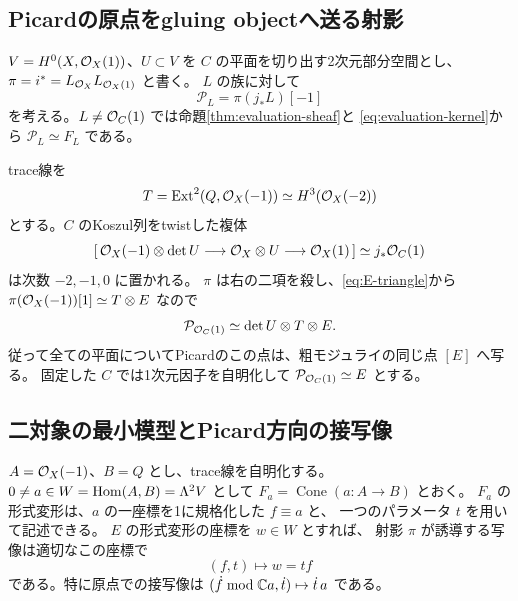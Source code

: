 \subsection{Picardの原点をgluing objectへ送る射影}

$V=H^0(X,\mathcal O_X(1))$、$U\subset V$ を $C$ の平面を切り出す2次元部分空間とし、
$\pi=i^*=L_{\mathcal O_X}L_{\mathcal O_X(1)}$ と書く。
$L$ の族に対して
\[
 \mathcal P_L=\pi(j_*L)[-1]
\]
を考える。$L\ne\mathcal O_C(1)$ では命題\ref{thm:evaluation-sheaf}と
\eqref{eq:evaluation-kernel}から $\mathcal P_L\simeq F_L$ である。

trace線を
\[
 T=\operatorname{Ext}^2(Q,\mathcal O_X(-1))\simeq H^3(\mathcal O_X(-2))
\]
とする。$C$ のKoszul列をtwistした複体
\[
 [\,\mathcal O_X(-1)\otimes\det U\longrightarrow
       \mathcal O_X\otimes U\longrightarrow\mathcal O_X(1)\,]
 \simeq j_*\mathcal O_C(1)
\]
は次数 $-2,-1,0$ に置かれる。
$\pi$ は右の二項を殺し、\eqref{eq:E-triangle}から
$\pi(\mathcal O_X(-1))[1]\simeq T\otimes E$ なので
\begin{equation}\label{eq:picard-special-object}
 \mathcal P_{\mathcal O_C(1)}\simeq\det U\otimes T\otimes E.
\end{equation}
従って全ての平面についてPicardのこの点は、粗モジュライの同じ点 $[E]$ へ写る。
固定した $C$ では1次元因子を自明化して $\mathcal P_{\mathcal O_C(1)}\simeq E$ とする。

\subsection{二対象の最小模型とPicard方向の接写像}

\begin{lemma}[射影の局所的な積の公式]\label{lem:mutation-product}
$A=\mathcal O_X(-1)$、$B=Q$ とし、trace線を自明化する。
$0\ne a\in W=\operatorname{Hom}(A,B)=\Lambda^2V$ として
$F_a=\operatorname{Cone}(a:A\to B)$ とおく。
$F_a$ の形式変形は、$a$ の一座標を1に規格化した $f\equiv a$ と、
一つのパラメータ $t$ を用いて記述できる。
$E$ の形式変形の座標を $w\in W$ とすれば、
射影 $\pi$ が誘導する写像は適切なこの座標で
\[
                       (f,t)\longmapsto w=tf
\]
である。特に原点での接写像は
$(\dot f\bmod\mathbb C a,\dot t)\mapsto\dot t\,a$ である。
\end{lemma}

